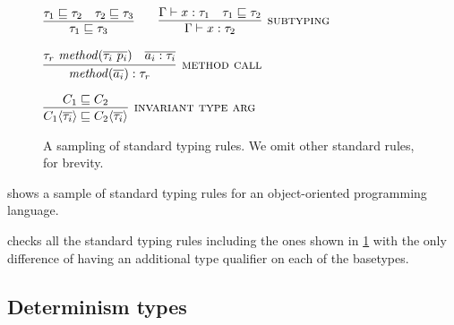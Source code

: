 \begin{figure}
    \bigskip

    $\infer{\tau_1 \sqsubseteq \tau_3}{\tau_1 \sqsubseteq \tau_2 \quad \tau_2 \sqsubseteq \tau_3}
    \quad\quad
    \infer[\rulename{subtyping}]{\Gamma \vdash x : \tau_2}{\Gamma \vdash x : \tau_1 & \tau_1 \sqsubseteq \tau_2}$
    
    \bigskip
    
    $\infer[\rulename{method call}]{\|method|(\overline{a_i}) : \tau_r}{\tau_r \  \|method|(\overline{\tau_i \  p_i}) & \overline{a_i : \tau_i}}$
    
    \bigskip
    
    $\infer[\rulename{invariant type arg}]{C_1\angles{\overline{\tau_i}}
      \sqsubseteq C_2\angles{\overline{\tau_i}}}{C_1 \sqsubseteq C_2}$
    
    \caption{A sampling of standard typing rules.  We omit other standard rules,
    for brevity.}
    \label{typecheck-rules-standard}
\end{figure}

%
%

 shows a sample of standard typing rules for
an object-oriented programming language.



\OurTypeSystem checks all the standard typing rules including the ones shown in \cref{typecheck-rules-standard} with
the only difference of having an additional type qualifier on each of the basetypes.


\subsection{Determinism types}\label{type-hierarchy}

